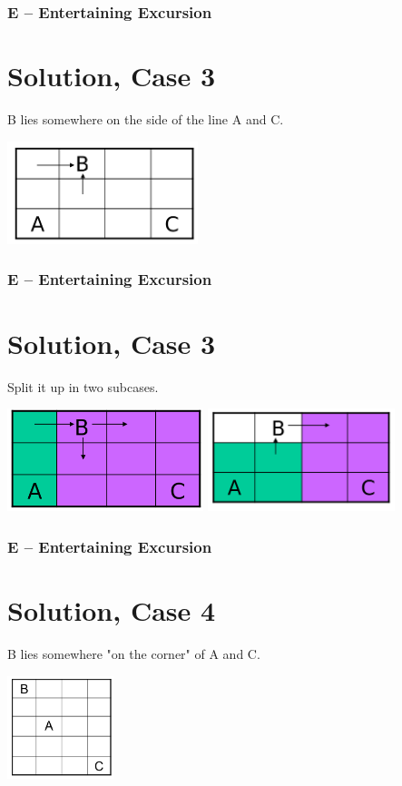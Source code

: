 \begin{frame}
  \frametitle{E -- Entertaining Excursion}
  \section*{Solution, Case 3}

  B lies somewhere on the side of the line A and C.

  \includegraphics[height=3cm]{entertainingexcursion/case3.png}
\end{frame}

\begin{frame}
  \frametitle{E -- Entertaining Excursion}
  \section*{Solution, Case 3}

  Split it up in two subcases.

  \includegraphics[height=3cm]{entertainingexcursion/case3_1.png}
  \includegraphics[height=3cm]{entertainingexcursion/case3_2.png}
\end{frame}
\begin{frame}
  \frametitle{E -- Entertaining Excursion}
  \section*{Solution, Case 4}

  B lies somewhere "on the corner" of A and C.

  \includegraphics[height=3cm]{entertainingexcursion/case4.png}
\end{frame}
